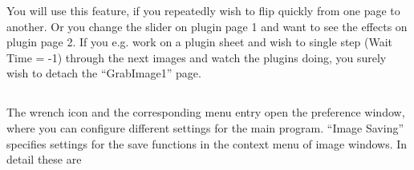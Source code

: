 You will use this feature, if you repeatedly wish to flip quickly
from one page to another. Or you change the slider on plugin page 1
and want to see the effects on plugin page 2. If you e.g. work on
a plugin sheet and wish to single step (Wait Time = -1) through the
next images and watch the plugins doing, you surely wish to detach
the ``GrabImage1'' page.

\subsection{}
\label{sub:preferences}

The wrench icon and the corresponding menu entry open the preference
window, where you can configure different settings for the
\icewing{} main program. ``Image Saving'' specifies settings for the
save functions in the context menu of image windows. In detail these
are

